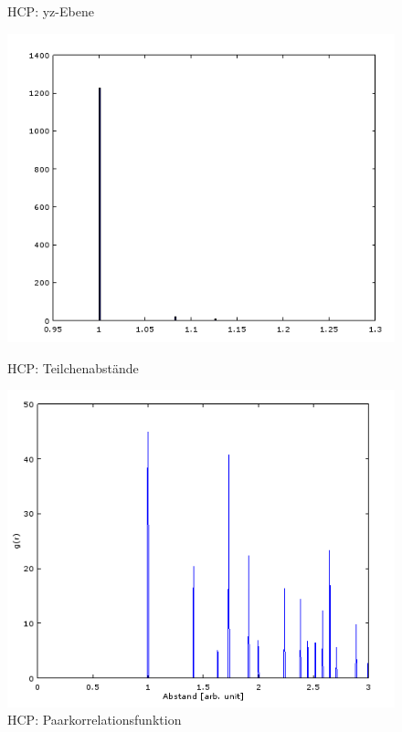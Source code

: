 \begin{figure}[H]
\begin{minipage}[b]{0.3\textwidth}
    \caption{HCP: yz-Ebene}
    \label{fig:hcpyz}
\end{minipage} 
\end{figure}

\begin{figure}[H]
\begin{minipage}[b]{0.5\textwidth}
    \centering
    \includegraphics[scale=0.5]{data/hcp-hist.PNG}
    \caption{HCP: Teilchenabstände}
    \label{fig:hcpabstand}
\end{minipage}    
\begin{minipage}[b]{0.5\textwidth}
    \centering
    \includegraphics[scale=0.5]{data/hcp-paircorrelation.PNG}
    \caption{HCP: Paarkorrelationsfunktion}
    \label{fig:hcpg}
\end{minipage} 
\end{figure}










